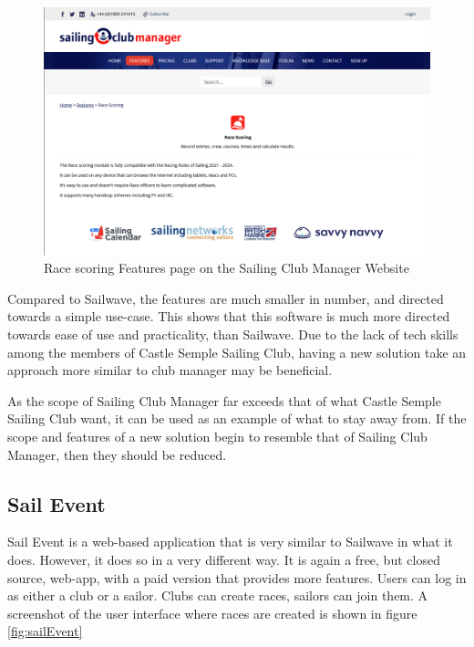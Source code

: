\documentclass{l4proj}
\begin{document}
\begin{figure}[H]
    \centering
    \includegraphics[width=1\linewidth]{images/ClubManager.png} 

    \caption{Race scoring Features page on the Sailing Club Manager Website \citep{ClubManager}
    }

    \label{fig:ClubManager}
\end{figure}
Compared to Sailwave, the features are much smaller in number, and directed towards a simple use-case. This shows that this software is much more directed towards ease of use and practicality, than Sailwave. Due to the lack of tech skills among the members of Castle Semple Sailing Club, having a new solution take an approach more similar to club manager may be beneficial.

As the scope of Sailing Club Manager far exceeds that of what Castle Semple Sailing Club want, it can be used as an example of what to stay away from. If the scope and features of a new solution begin to resemble that of Sailing Club Manager, then they should be reduced.


\subsection{Sail Event}

Sail Event \citet{SailEvent} is a web-based application that is very similar to Sailwave in what it does. However, it does so in a very different way. It is again a free, but closed source, web-app, with a paid version that provides more features. Users can log in as either a club or a sailor. Clubs can create races, sailors can join them. A screenshot of the user interface where races are created is shown in figure \ref{fig:sailEvent}
\end{document}
